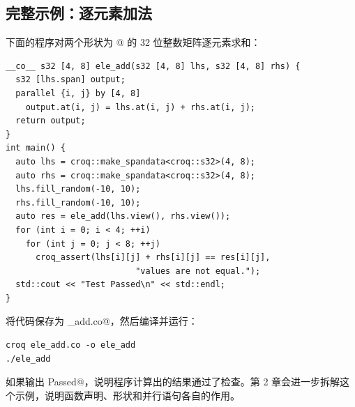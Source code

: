 \subsection*{完整示例：逐元素加法}

下面的程序对两个形状为 \co@[4, 8]@ 的 32 位整数矩阵逐元素求和：

\begin{lstlisting}[language=croqtile,caption={完整的逐元素加法程序}]
__co__ s32 [4, 8] ele_add(s32 [4, 8] lhs, s32 [4, 8] rhs) {
  s32 [lhs.span] output;
  parallel {i, j} by [4, 8]
    output.at(i, j) = lhs.at(i, j) + rhs.at(i, j);
  return output;
}
int main() {
  auto lhs = croq::make_spandata<croq::s32>(4, 8);
  auto rhs = croq::make_spandata<croq::s32>(4, 8);
  lhs.fill_random(-10, 10);
  rhs.fill_random(-10, 10);
  auto res = ele_add(lhs.view(), rhs.view());
  for (int i = 0; i < 4; ++i)
    for (int j = 0; j < 8; ++j)
      croq_assert(lhs[i][j] + rhs[i][j] == res[i][j],
                          "values are not equal.");
  std::cout << "Test Passed\n" << std::endl;
}
\end{lstlisting}

将代码保存为 \co@ele_add.co@，然后编译并运行：

\begin{lstlisting}[language=croqtile,caption={编译并运行加法示例}]
croq ele_add.co -o ele_add
./ele_add
\end{lstlisting}

如果输出 \co@Test Passed@，说明程序计算出的结果通过了检查。第 2 章会进一步拆解这个示例，说明函数声明、形状和并行语句各自的作用。

